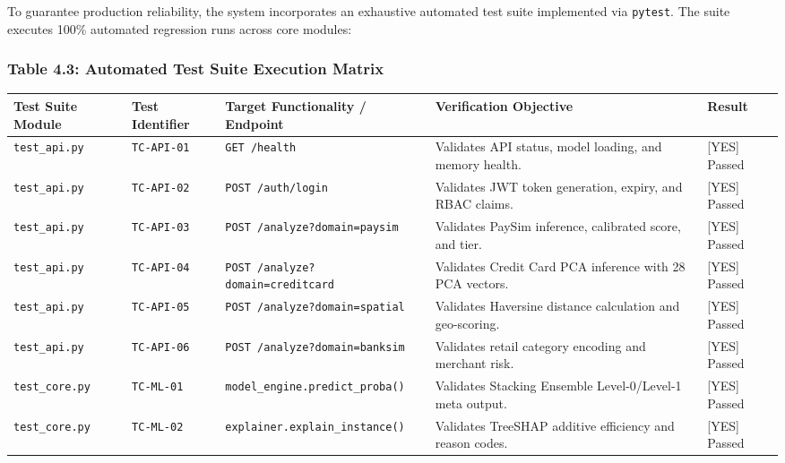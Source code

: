 \documentclass[12pt,a4paper,oneside]{report}
\begin{document}
To guarantee production reliability, the system incorporates an exhaustive automated test suite implemented via \texttt{pytest}. The suite executes 100\% automated regression runs across core modules:


\subsubsection{Table 4.3: Automated Test Suite Execution Matrix}

\begin{table}[H]
\centering
\footnotesize
\begin{adjustbox}{width=\textwidth,center}
\begin{tabular}{| l | l | l | l | l |}
\hline
\rowcolor{tableheader} \textbf{Test Suite Module} & \textbf{Test Identifier} & \textbf{Target Functionality / Endpoint} & \textbf{Verification Objective} & \textbf{Result} \\ \hline
\texttt{test\_api.py} & \texttt{TC-API-01} & \texttt{GET /health} & Validates API status, model loading, and memory health. & [YES] Passed \\ \hline
\rowcolor{tablealt} \texttt{test\_api.py} & \texttt{TC-API-02} & \texttt{POST /auth/login} & Validates JWT token generation, expiry, and RBAC claims. & [YES] Passed \\ \hline
\texttt{test\_api.py} & \texttt{TC-API-03} & \texttt{POST /analyze?domain=paysim} & Validates PaySim inference, calibrated score, and tier. & [YES] Passed \\ \hline
\rowcolor{tablealt} \texttt{test\_api.py} & \texttt{TC-API-04} & \texttt{POST /analyze?domain=creditcard} & Validates Credit Card PCA inference with 28 PCA vectors. & [YES] Passed \\ \hline
\texttt{test\_api.py} & \texttt{TC-API-05} & \texttt{POST /analyze?domain=spatial} & Validates Haversine distance calculation and geo-scoring. & [YES] Passed \\ \hline
\rowcolor{tablealt} \texttt{test\_api.py} & \texttt{TC-API-06} & \texttt{POST /analyze?domain=banksim} & Validates retail category encoding and merchant risk. & [YES] Passed \\ \hline
\texttt{test\_core.py} & \texttt{TC-ML-01} & \texttt{model\_engine.predict\_proba()} & Validates Stacking Ensemble Level-0/Level-1 meta output. & [YES] Passed \\ \hline
\rowcolor{tablealt} \texttt{test\_core.py} & \texttt{TC-ML-02} & \texttt{explainer.explain\_instance()} & Validates TreeSHAP additive efficiency and reason codes. & [YES] Passed \\ \hline

\end{tabular}
\end{adjustbox}
\end{table}
\end{document}
